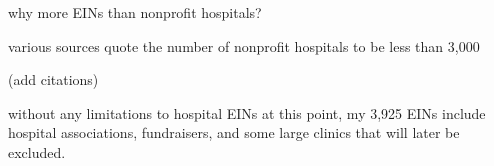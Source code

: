 \documentclass[notes,11pt, aspectratio=169]{beamer}
\newenvironment{wideitemize}{\itemize\addtolength{\itemsep}{10pt}}{\enditemize}
\begin{document}
\begin{frame}{why more EINs than nonprofit hospitals?}\label{why more?}
    \begin{wideitemize}
        \item various sources quote the number of nonprofit hospitals to be less than 3,000
        \begin{wideitemize}
            \item (add citations)
        \end{wideitemize}
        \item without any limitations to hospital EINs at this point, my 3,925 EINs include hospital associations, fundraisers, and some large clinics that will later be excluded.
    \end{wideitemize}

    \vspace{10mm}

    \hyperlink{accessing hospital forms}{}
\end{frame}
\end{document}
